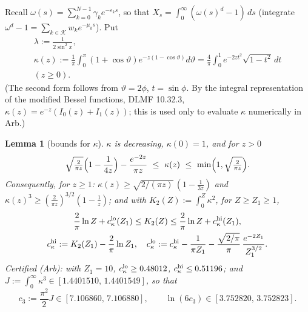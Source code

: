 \documentclass[11pt,a4paper]{article}
\newtheorem{lemma}[theorem]{Lemma}
\theoremstyle{definition}
\theoremstyle{remark}
\begin{document}
Recall $\omega(s)=\sum_{k=0}^{N-1}\gamma_ke^{-\varepsilon_ks}$, so that $X_s=\int_0^\infty(\omega(s)^d-1)\,ds$ (integrate $\omega^d-1=\sum_{k\in\mathcal K}w_ke^{-\mu_ks}$). Put
\begin{gather*}
\lambda:=\frac1{2\sin^2x}, \\
\kappa(z):=\frac1\pi\int_0^\pi(1+\cos\vartheta)e^{-z(1-\cos\vartheta)}d\vartheta=\frac4\pi\int_0^1e^{-2zt^2}\sqrt{1-t^2}\,dt \\
(z\ge0).
\end{gather*}
(The second form follows from $\vartheta=2\phi$, $t=\sin\phi$. By the integral representation of the modified Bessel functions, DLMF 10.32.3, $\kappa(z)=e^{-z}(I_0(z)+I_1(z))$; this is used only to evaluate $\kappa$ numerically in Arb.)

\begin{lemma}[{bounds for $\kappa$}]
$\kappa$ is decreasing, $\kappa(0)=1$, and for $z>0$
\begin{equation*}
\sqrt{\tfrac{2}{\pi z}}\Bigl(1-\frac1{4z}\Bigr)-\frac{e^{-2z}}{\pi z}\ \le\ \kappa(z)\ \le\ \min\Bigl(1,\sqrt{\tfrac{2}{\pi z}}\Bigr).
\end{equation*}
Consequently, for $z\ge1$: $\kappa(z)\ge\sqrt{2/(\pi z)}\,(1-\frac1{3z})$ and $\kappa(z)^3\ge(\frac{2}{\pi z})^{3/2}(1-\frac1z)$; and with $K_2(Z):=\int_0^Z\kappa^2$, for $Z\ge Z_1\ge1$,
\begin{gather*}
\frac2\pi\ln Z+c_\kappa^{\rm lo}(Z_1)\le K_2(Z)\le\frac2\pi\ln Z+c_\kappa^{\rm hi}(Z_1), \\
c_\kappa^{\rm hi}:=K_2(Z_1)-\frac2\pi\ln Z_1,\quad c_\kappa^{\rm lo}:=c_\kappa^{\rm hi}-\frac1{\pi Z_1}-\frac{\sqrt{2/\pi}}{\pi}\,\frac{e^{-2Z_1}}{Z_1^{3/2}} .
\end{gather*}
Certified (Arb): with $Z_1=10$, $c_\kappa^{\rm lo}\ge0.48012$, $c_\kappa^{\rm hi}\le0.51196$; and $J:=\int_0^\infty\kappa^3\in[1.4401510,\,1.4401549]$, so that
\begin{equation*}
c_3:=\frac{\pi^2}{2}J\in[7.106860,\,7.106880],\qquad \ln(6c_3)\in[3.752820,\,3.752823].
\end{equation*}
\end{lemma}
\end{document}
